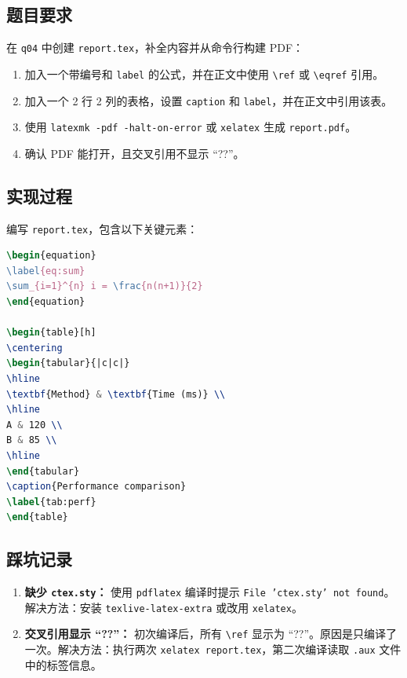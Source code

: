 \documentclass[12pt, a4paper]{article}
\numberwithin{equation}{section}
\begin{document}
\subsection{题目要求}
在 \texttt{q04} 中创建 \texttt{report.tex}，补全内容并从命令行构建 PDF：
\begin{enumerate}
    \item 加入一个带编号和 \texttt{label} 的公式，并在正文中使用 \texttt{\textbackslash ref} 或 \texttt{\textbackslash eqref} 引用。
    \item 加入一个 2 行 2 列的表格，设置 \texttt{caption} 和 \texttt{label}，并在正文中引用该表。
    \item 使用 \texttt{latexmk -pdf -halt-on-error} 或 \texttt{xelatex} 生成 \texttt{report.pdf}。
    \item 确认 PDF 能打开，且交叉引用不显示 “??”。
\end{enumerate}

\subsection{实现过程}
编写 \texttt{report.tex}，包含以下关键元素：
\begin{lstlisting}[language=tex, caption=公式与表格的 LaTeX 代码]
\begin{equation}
\label{eq:sum}
\sum_{i=1}^{n} i = \frac{n(n+1)}{2}
\end{equation}

\begin{table}[h]
\centering
\begin{tabular}{|c|c|}
\hline
\textbf{Method} & \textbf{Time (ms)} \\
\hline
A & 120 \\
B & 85 \\
\hline
\end{tabular}
\caption{Performance comparison}
\label{tab:perf}
\end{table}
\end{lstlisting}

\subsection{踩坑记录}
\begin{enumerate}
    \item \textbf{缺少 \texttt{ctex.sty}：} 使用 \texttt{pdflatex} 编译时提示 \texttt{File 'ctex.sty' not found}。解决方法：安装 \texttt{texlive-latex-extra} 或改用 \texttt{xelatex}。
    \item \textbf{交叉引用显示 “??”：} 初次编译后，所有 \texttt{\textbackslash ref} 显示为 “??”。原因是只编译了一次。解决方法：执行两次 \texttt{xelatex report.tex}，第二次编译读取 \texttt{.aux} 文件中的标签信息。
\end{enumerate}
\end{document}
